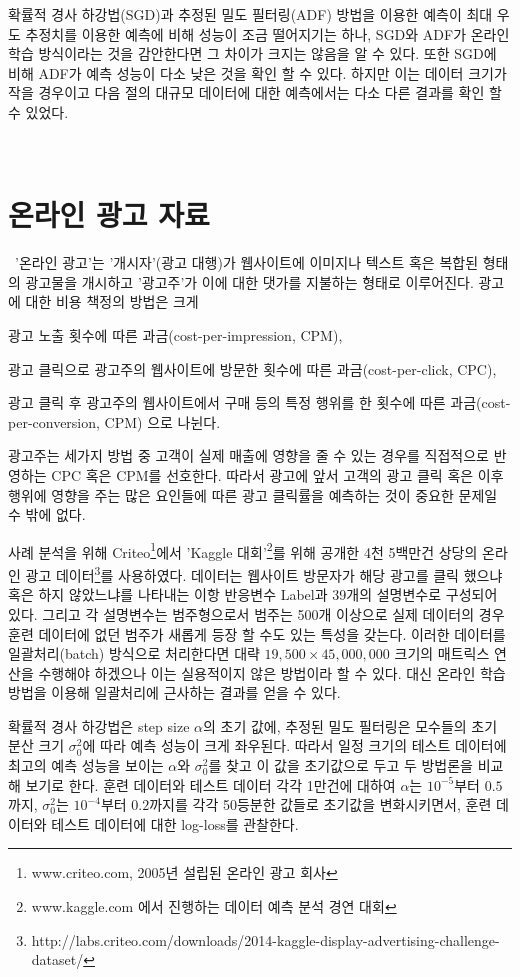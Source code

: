 \documentclass[oneside,b5paper,11pt]{book}
\theoremstyle{plain}
\theoremstyle{definition}
\theoremstyle{remark}
\theoremstyle{definition}
\numberwithin{equation}{chapter}
\begin{document}
확률적 경사 하강법(SGD)과 추정된 밀도 필터링(ADF) 방법을 이용한 예측이 최대 우도 추정치를 이용한 예측에 비해 성능이 조금 떨어지기는 하나, SGD와 ADF가 온라인 학습 방식이라는 것을 감안한다면 그 차이가 크지는 않음을 알 수 있다. 또한 SGD에 비해 ADF가 예측 성능이 다소 낮은 것을 확인 할 수 있다. 하지만 이는 데이터 크기가 작을 경우이고 다음 절의 대규모 데이터에 대한 예측에서는 다소 다른 결과를 확인 할 수 있었다.


{}\
\section{온라인 광고 자료}
{}\
 '온라인 광고'는 '개시자'(광고 대행)가 웹사이트에 이미지나 텍스트 혹은 복합된 형태의 광고물을 개시하고 '광고주'가 이에 대한 댓가를 지불하는 형태로 이루어진다. 광고에 대한 비용 책정의 방법은 크게
 \begin{inparaenum}[i)]
 \item 광고 노출 횟수에 따른 과금(cost-per-impression, CPM),
 \item 광고 클릭으로 광고주의 웹사이트에 방문한 횟수에 따른 과금(cost-per-click, CPC),
 \item 광고 클릭 후 광고주의 웹사이트에서 구매 등의 특정 행위를 한 횟수에 따른 과금(cost-per-conversion, CPM) 으로 나뉜다.
 \end{inparaenum}
 광고주는 세가지 방법 중 고객이 실제 매출에 영향을 줄 수 있는 경우를 직접적으로 반영하는 CPC 혹은 CPM를 선호한다. 따라서 광고에 앞서 고객의 광고 클릭 혹은 이후 행위에 영향을 주는 많은 요인들에 따른 광고 클릭률을 예측하는 것이 중요한 문제일 수 밖에 없다.\citep{Chapelle2013}

 사례 분석을 위해 Criteo\footnote{www.criteo.com, 2005년 설립된 온라인 광고 회사}에서 'Kaggle 대회'\footnote{www.kaggle.com 에서 진행하는 데이터 예측 분석 경연 대회}를 위해 공개한 4천 5백만건 상당의 온라인 광고 데이터\footnote{http://labs.criteo.com/downloads/2014-kaggle-display-advertising-challenge-dataset/}를 사용하였다. 데이터는 웹사이트 방문자가 해당 광고를 클릭 했으냐 혹은 하지 않았느냐를 나타내는 이항 반응변수 Label과 39개의 설명변수로 구성되어 있다. 그리고 각 설명변수는 범주형으로서 범주는 500개 이상으로 실제 데이터의 경우 훈련 데이터에 없던 범주가 새롭게 등장 할 수도 있는 특성을 갖는다. 이러한 데이터를 일괄처리(batch) 방식으로 처리한다면 대략 $19,500 \times 45,000,000$ 크기의 매트릭스 연산을 수행해야 하겠으나 이는 실용적이지 않은 방법이라 할 수 있다. 대신 온라인 학습 방법을 이용해 일괄처리에 근사하는 결과를 얻을 수 있다.

  확률적 경사 하강법은 step size $\alpha$의 초기 값에, 추정된 밀도 필터링은 모수들의 초기 분산 크기 $\sigma_0^2$에 따라 예측 성능이 크게 좌우된다. 따라서 일정 크기의 테스트 데이터에 최고의 예측 성능을 보이는 $\alpha$와 $\sigma_0^2$를 찾고 이 값을 초기값으로 두고 두 방법론을 비교해 보기로 한다. 훈련 데이터와 테스트 데이터 각각 1만건에 대하여  $\alpha$는 $10^{-5}$부터 $0.5$까지, $\sigma_0^2$는 $10^{-4}$부터 $0.2$까지를 각각 50등분한 값들로 초기값을 변화시키면서, 훈련 데이터와 테스트 데이터에 대한 log-loss를 관찰한다.
\end{document}
